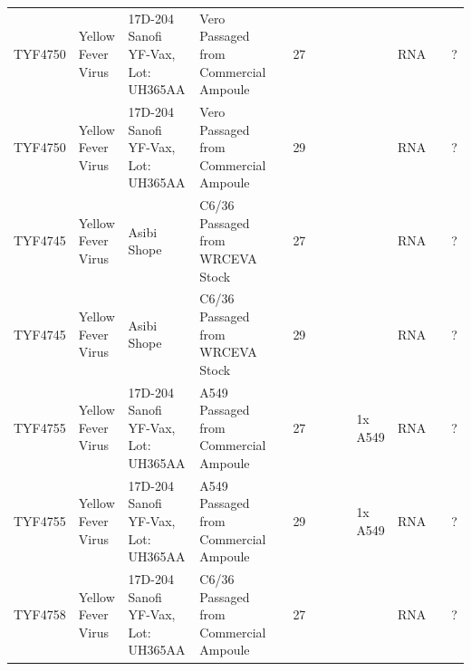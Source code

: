 \begin{longtable}{@{}lllllllllllll@{}}
TYF4750        & Yellow Fever Virus & 17D-204 Sanofi YF-Vax, Lot: UH365AA       & Vero Passaged from Commercial Ampoule  &             & 27                      &                       &           &          &                             & RNA                &                                                                                                  & ?                          \\
TYF4750        & Yellow Fever Virus & 17D-204 Sanofi YF-Vax, Lot: UH365AA       & Vero Passaged from Commercial Ampoule  &             & 29                      &                       &           &          &                             & RNA                &                                                                                                  & ?                          \\
TYF4745        & Yellow Fever Virus & Asibi Shope                               & C6/36 Passaged from WRCEVA Stock       &             & 27                      &                       &           &          &                             & RNA                &                                                                                                  & ?                          \\
TYF4745        & Yellow Fever Virus & Asibi Shope                               & C6/36 Passaged from WRCEVA Stock       &             & 29                      &                       &           &          &                             & RNA                &                                                                                                  & ?                          \\
TYF4755        & Yellow Fever Virus & 17D-204 Sanofi YF-Vax, Lot: UH365AA       & A549 Passaged from Commercial Ampoule  &             & 27                      &                       &           &          & 1x A549                     & RNA                &                                                                                                  & ?                          \\
TYF4755        & Yellow Fever Virus & 17D-204 Sanofi YF-Vax, Lot: UH365AA       & A549 Passaged from Commercial Ampoule  &             & 29                      &                       &           &          & 1x A549                     & RNA                &                                                                                                  & ?                          \\
TYF4758        & Yellow Fever Virus & 17D-204 Sanofi YF-Vax, Lot: UH365AA       & C6/36 Passaged from Commercial Ampoule &             & 27                      &                       &           &          &                             & RNA                &                                                                                                  & ?                          \\

\end{longtable}
